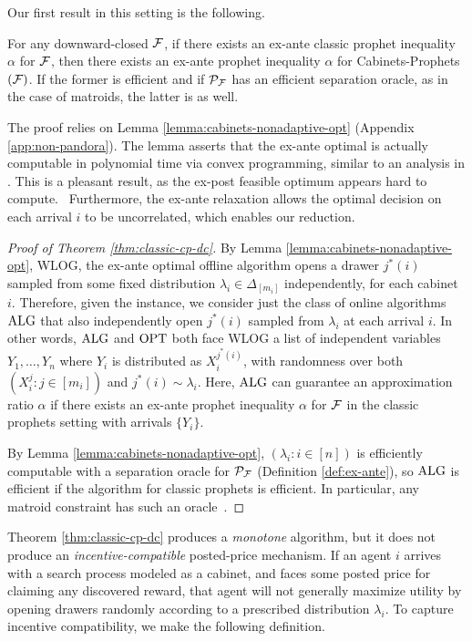 Our first result in this setting is the following.
\begin{theorem} \label{thm:classic-cp-dc}
  For any downward-closed $\mathcal{F}$, if there exists an ex-ante classic prophet inequality $\alpha$ for $\mathcal{F}$, then there exists an ex-ante prophet inequality $\alpha$ for Cabinets-Prophets$(\mathcal{F})$.
  If the former is efficient and if $\mathcal{P}_{\mathcal{F}}$ has an efficient separation oracle, as in the case of matroids, the latter is as well.
\end{theorem}
The proof relies on Lemma \ref{lemma:cabinets-nonadaptive-opt} (Appendix \ref{app:non-pandora}).
The lemma asserts that the ex-ante optimal is actually computable in polynomial time via convex programming, similar to an analysis in \citet{feldman2016online}.
This is a pleasant result, as the ex-post feasible optimum appears hard to compute.~
Furthermore, the ex-ante relaxation allows the optimal decision on each arrival $i$ to be uncorrelated, which enables our reduction.
\begin{proof}[Proof of Theorem \ref{thm:classic-cp-dc}]
  By Lemma \ref{lemma:cabinets-nonadaptive-opt}, WLOG, the ex-ante optimal offline algorithm opens a drawer $j^*(i)$ sampled from some fixed distribution $\lambda_i \in \Delta_{[m_i]}$ independently, for each cabinet $i$.
  Therefore, given the instance, we consider just the class of online algorithms $\mathrm{ALG}$ that also independently open $j^*(i)$ sampled from $\lambda_i$ at each arrival $i$.
  In other words, $\mathrm{ALG}$ and $\mathrm{OPT}$ both face WLOG a list of independent variables $Y_1,\dots,Y_n$ where $Y_i$ is distributed as $X_i^{j^*(i)}$, with randomness over both $(X_i^j : j \in [m_i])$ and $j^*(i) \sim \lambda_i$.
  Here, $\mathrm{ALG}$ can guarantee an approximation ratio $\alpha$ if there exists an ex-ante prophet inequality $\alpha$ for $\mathcal{F}$ in the classic prophets setting with arrivals $\{Y_i\}$.

  By Lemma \ref{lemma:cabinets-nonadaptive-opt}, $(\lambda_i : i \in [n])$ is efficiently computable with a separation oracle for $\mathcal{P}_{\mathcal{F}}$ (Definition \ref{def:ex-ante}), so $\mathrm{ALG}$ is efficient if the algorithm for classic prophets is efficient.
  In particular, any matroid constraint has such an oracle~\citep{cunningham1984testing}. 
\end{proof}

Theorem \ref{thm:classic-cp-dc} produces a \emph{monotone} algorithm, but it does not produce an \emph{incentive-compatible} posted-price mechanism.
If an agent $i$ arrives with a search process modeled as a cabinet, and faces some posted price for claiming any discovered reward, that agent will not generally maximize utility by opening drawers randomly according to a prescribed distribution $\lambda_i$.
To capture incentive compatibility, we make the following definition.

